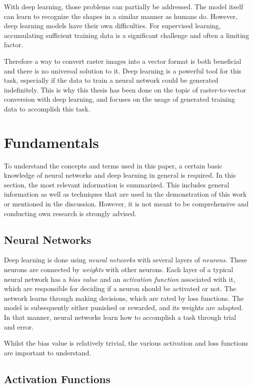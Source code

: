 \documentclass[12pt, a4paper, titlepage]{report}
\begin{document}
With deep learning, those problems can partially be addressed. The model itself can learn to recognize the shapes in a similar manner as humans do.
However, deep learning models have their own difficulties. For supervised learning, accumulating sufficient training data is a significant challenge and often a limiting factor.

Therefore a way to convert raster images into a vector format is both beneficial and there is no universal solution to it. Deep learning is a powerful tool for this task, especially if the data to train a neural network could be generated indefinitely.
This is why this thesis has been done on the topic of raster-to-vector conversion with deep learning, and focuses on the usage of generated training data to accomplish this task.


\section{Fundamentals}

To understand the concepts and terms used in this paper, a certain basic knowledge of neural networks and deep learning in general is required. In this section, the most relevant information is summarized. This includes general information as well as techniques that are used in the demonstration of this work or mentioned in the discussion. However, it is not meant to be comprehensive and conducting own research is strongly advised.

\subsection{Neural Networks}

Deep learning is done using \emph{neural networks} with several layers of \emph{neurons}. These neurons are connected by \emph{weights} with other neurons.
Each layer of a typical neural network has a \emph{bias value} and an \emph{activation function} associated with it, which are responsible for deciding if a neuron should be activated or not. The network learns through making decisions, which are rated by loss functions. The model is subsequently either punished or rewarded, and its weights are adapted. In that manner, neural networks learn how to accomplish a task through trial and error.

Whilst the bias value is relatively trivial, the various activation and loss functions are important to understand.

\subsection{Activation Functions}
\end{document}
